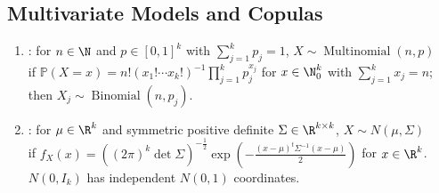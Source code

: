 \subsection{Multivariate Models and Copulas}
\begin{definition} \label{def:multinomial-and-multivariate-normal} 
\begin{enumerate}[label=(\roman*)]
\setlength{\itemsep}{0pt}
\item {}: for $n\in\N$ and $p\in[0,1]^k$ with $\sum\limits_{j=1}^{k}p_j=1$, $X\sim\operatorname{Multinomial}(n,p)$\\
if $\mathbb{P}(X=x)=n!(x_1!\cdots x_k!)^{-1}\prod\limits_{j=1}^{k}p_j^{x_j}$ for $x\in\N_0^k$ with $\sum\limits_{j=1}^{k}x_j=n$; then $X_j\sim\operatorname{Binomial}(n,p_j)$.
\item {}: for $\mu\in\R^k$ and symmetric positive definite $\Sigma\in\R^{k\times k}$, $X\sim N(\mu,\Sigma)$\\
if $f_X(x)=((2\pi)^k\det\Sigma)^{-\frac{1}{2}}\exp(-\frac{(x-\mu)^t\Sigma^{-1}(x-\mu)}{2})$ for $x\in\R^k$.\\
$N(0,I_k)$ has independent $N(0,1)$ coordinates.
\end{enumerate}
\end{definition}

